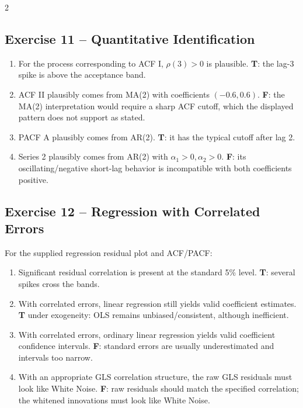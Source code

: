 \documentclass[9pt,a4paper]{extarticle}
\begin{document}
\begin{multicols}{2}
\subsection*{Exercise 11 -- Quantitative Identification}
\begin{enumerate}[label=\alph*),leftmargin=4mm]
\item For the process corresponding to ACF I, \(\rho(3)>0\) is plausible. \textbf{T}: the lag-3 spike is above the acceptance band.
\item ACF II plausibly comes from MA(2) with coefficients \((-0.6,0.6)\). \textbf{F}: the MA(2) interpretation would require a sharp ACF cutoff, which the displayed pattern does not support as stated.
\item PACF A plausibly comes from AR(2). \textbf{T}: it has the typical cutoff after lag 2.
\item Series 2 plausibly comes from AR(2) with \(\alpha_1>0,\alpha_2>0\). \textbf{F}: its oscillating/negative short-lag behavior is incompatible with both coefficients positive.
\end{enumerate}

\subsection*{Exercise 12 -- Regression with Correlated Errors}
For the supplied regression residual plot and ACF/PACF:
\begin{enumerate}[label=\alph*),leftmargin=4mm]
\item Significant residual correlation is present at the standard 5\% level. \textbf{T}: several spikes cross the bands.
\item With correlated errors, linear regression still yields valid coefficient estimates. \textbf{T} under exogeneity: OLS remains unbiased/consistent, although inefficient.
\item With correlated errors, ordinary linear regression yields valid coefficient confidence intervals. \textbf{F}: standard errors are usually underestimated and intervals too narrow.
\item With an appropriate GLS correlation structure, the raw GLS residuals must look like White Noise. \textbf{F}: raw residuals should match the specified correlation; the whitened innovations must look like White Noise.
\end{enumerate}


\end{multicols}
\end{document}
